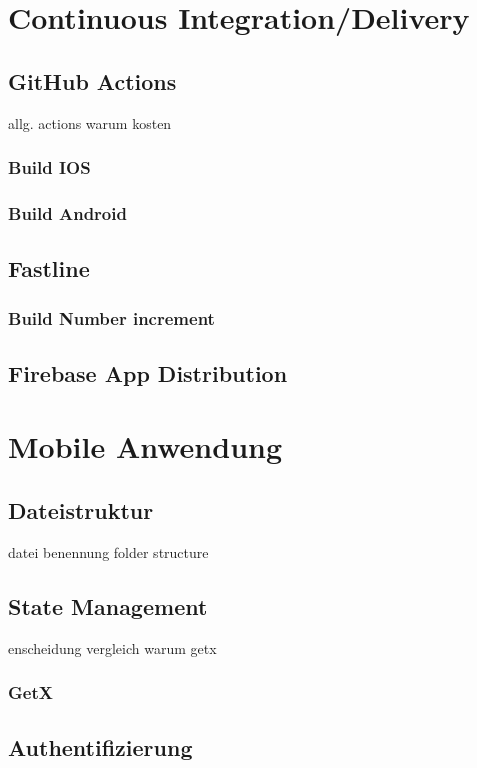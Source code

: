 \section{Continuous Integration/Delivery}
\subsection{GitHub Actions}

allg. actions warum kosten
\subsubsection{Build IOS}
\author{Martin Hausleitner}

\subsubsection{Build Android}

\subsection{Fastline}
\subsubsection{Build Number increment}
\subsection{Firebase App Distribution}

\section{Mobile Anwendung}
\subsection{Dateistruktur}
\author{Martin Hausleitner}

datei benennung folder structure
\subsection{State Management}
enscheidung vergleich warum getx
\author{Martin Hausleitner}

\subsubsection{GetX}


\subsection{Authentifizierung}
